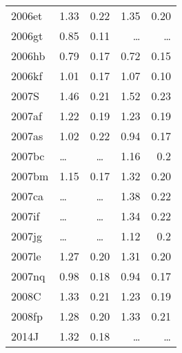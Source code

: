 \begin{table}
\begin{minipage}{70mm}
\begin{center}
\begin{tabular}{llcrr}
2006et	&	1.33	&	0.22	&	1.35	&	0.20	\\
2006gt 	& 0.85 		& 0.11 &\ldots & \ldots\\
2006hb	&	0.79	&	0.17	&	0.72	&	0.15	\\
2006kf	&	1.01	&	0.17	&	1.07	&	0.10	\\
2007S	&	1.46	&	0.21	&	1.52	&	0.23	\\
2007af	&	1.22	&	0.19	&	1.23	&	0.19	\\
2007as	&	1.02	&	0.22	&	0.94	&	0.17	\\
2007bc  &\ldots & \ldots & 1.16 &  0.2 \\
2007bm	&	1.15	&	0.17	&	1.32	&	0.20	\\
2007ca  &\ldots & \ldots & 1.38 &  0.22 \\
2007if  &\ldots & \ldots & 1.34 & 0.22 \\
2007jg  &\ldots & \ldots & 1.12 & 0.2  \\
2007le	&	1.27	&	0.20	&	1.31	&	0.20	\\
2007nq	&	0.98	&	0.18	&	0.94	&	0.17	\\
2008C	&	1.33	&	0.21	&	1.23	&	0.19	\\
2008fp	&	1.28	&	0.20	&	1.33	&	0.21	\\
2014J & 1.32 & 0.18 &\ldots & \ldots \\
\hline
\end{tabular}
\end{center}
\end{minipage}
\label{tab:yj}
\end{table}
